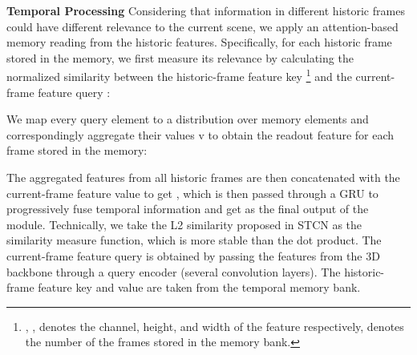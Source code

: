 \documentclass[10pt,twocolumn,letterpaper]{article}
\begin{document}
\noindent\textbf{Temporal Processing} Considering that information in different historic frames could have different relevance to the current scene, we apply an attention-based memory reading from the historic features. Specifically, for each historic frame  stored in the memory, we first measure its relevance by calculating the normalized similarity  between the historic-frame feature key \footnote{, ,  denotes the channel, height, and width of the feature respectively,  denotes the number of the frames stored in the memory bank.} and the current-frame feature query : 


We map every query element to a distribution over  memory elements and correspondingly aggregate their values v to obtain the readout feature  for each frame  stored in the memory:




The aggregated features from all historic frames are then concatenated with the current-frame feature value to get , which is then passed through a GRU to progressively fuse temporal information and get  as the final output of the module. Technically, we take the L2 similarity proposed in STCN\cite{cheng2021rethinking} as the similarity measure function, which is more stable than the dot product\cite{patrick2021keeping}. The current-frame feature query  is obtained by passing the features from the 3D backbone  through a query encoder (several convolution layers). The historic-frame feature key  and value  are taken from the temporal memory bank.
\end{document}
